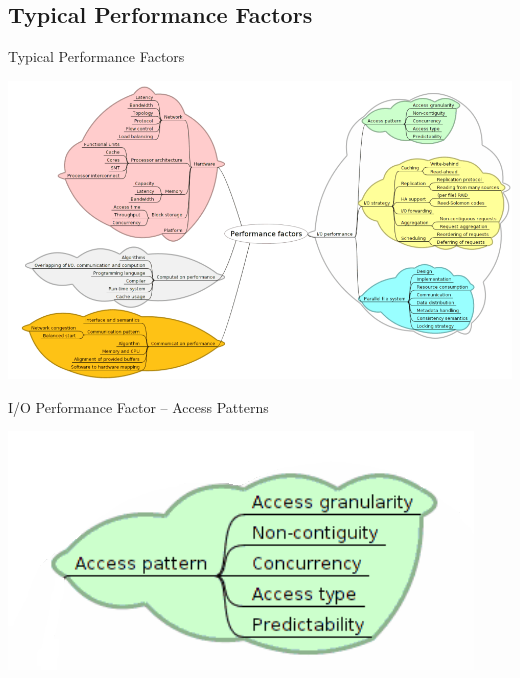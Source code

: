 \documentclass[compress,11pt,xcolor=svgnames,aspectratio=169]{beamer}
\begin{document}
\subsection{Typical Performance Factors}

\begin{frame}[t]{Typical Performance Factors}

\begin{center}
\includegraphics[scale=0.45]{fig/tree-perf}
\end{center}

\nocite{SOPPOAASLK13}

\end{frame}

\begin{frame}[t]{I/O Performance Factor -- Access Patterns}

\begin{center}
\includegraphics[scale=0.6]{fig/tree-io-ac-pat}
\end{center}

\nocite{SOPPOAASLK13}

\end{frame}
\end{document}
